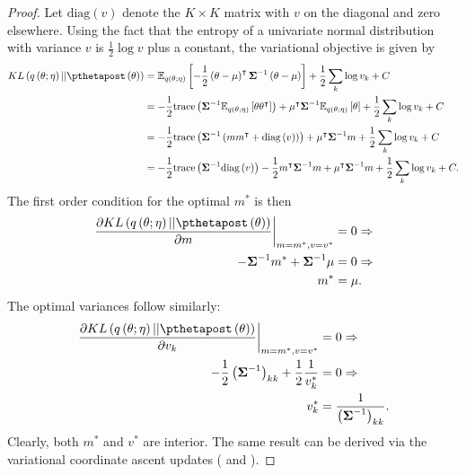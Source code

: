 \documentclass{article}\usepackage[]{graphicx}\usepackage[]{color}
\theoremstyle{plain}
\theoremstyle{definition}
\theoremstyle{plain}
\theoremstyle{plain}
\theoremstyle{plain}
\theoremstyle{plain}
\begin{document}
\begin{proof}
Let $\textrm{diag}\left(v\right)$ denote the $K\times K$ matrix
with $v$ on the diagonal and zero elsewhere. Using the fact that
the entropy of a univariate normal distribution with variance $v$
is $\frac{1}{2}\log v$ plus a constant, the variational objective
 is given by
\begin{align*}
KL\left(q\left(\theta;\eta\right)||\pthetapost\left(\theta\right)\right) & =\mbe_{q\left(\theta;\eta\right)}\left[-\frac{1}{2}\left(\theta-\mu\right)^{\trans}\covmat^{-1}\left(\theta-\mu\right)\right]+\frac{1}{2}\sum_{k}\log v_{k}+C\\
 & =-\frac{1}{2}\textrm{trace}\left(\covmat^{-1}\mbe_{q\left(\theta;\eta\right)}\left[\theta\theta^{\trans}\right]\right)+\mu^{\trans}\covmat^{-1}\mbe_{q\left(\theta;\eta\right)}\left[\theta\right]+\frac{1}{2}\sum_{k}\log v_{k}+C\\
 & =-\frac{1}{2}\textrm{trace}\left(\covmat^{-1}\left(mm^{\trans}+\textrm{diag}\left(v\right)\right)\right)+\mu^{\trans}\covmat^{-1}m+\frac{1}{2}\sum_{k}\log v_{k}+C\\
 & =-\frac{1}{2}\textrm{trace}\left(\covmat^{-1}\textrm{diag}\left(v\right)\right)-\frac{1}{2}m^{\trans}\covmat^{-1}m+\mu^{\trans}\covmat^{-1}m+\frac{1}{2}\sum_{k}\log v_{k}+C.
\end{align*}
The first order condition for the optimal $m^{*}$ is then
\begin{align*}
\left.\frac{\partial KL\left(q\left(\theta;\eta\right)||\pthetapost\left(\theta\right)\right)}{\partial m}\right|_{m=m^{*},v=v^{*}} & =0\Rightarrow\\
-\covmat^{-1}m^{*}+\covmat^{-1}\mu & =0\Rightarrow\\
m^{*} & =\mu.
\end{align*}
The optimal variances follow similarly: 
\begin{align*}
\left.\frac{\partial KL\left(q\left(\theta;\eta\right)||\pthetapost\left(\theta\right)\right)}{\partial v_{k}}\right|_{m=m^{*},v=v^{*}} & =0\Rightarrow\\
-\frac{1}{2}\left(\covmat^{-1}\right)_{kk}+\frac{1}{2}\frac{1}{v_{k}^{*}} & =0\Rightarrow\\
v_{k}^{*} & =\frac{1}{\left(\covmat^{-1}\right)_{kk}}.
\end{align*}
Clearly, both $m^{*}$ and $v^{*}$ are interior. The same result
can be derived via the variational coordinate ascent updates (\citet[Section 10.1.2]{bishop:2006:pattern}
and \citet[Appendix B]{giordano:2015:lrvb}).
\end{proof}
\end{document}
